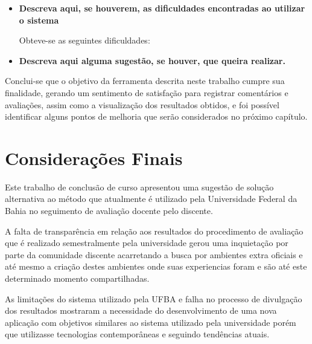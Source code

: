 \documentclass[12pt, a4paper]{report}
\begin{document}
\begin{itemize}
\item{\textbf{ Descreva aqui, se houverem, as dificuldades encontradas ao utilizar o sistema}}

Obteve-se as seguintes dificuldades:

\item{\textbf{ Descreva aqui alguma sugestão, se houver, que queira realizar.}}

\end{itemize}

Conclui-se que o objetivo da ferramenta descrita neste trabalho cumpre sua finalidade, gerando um sentimento de satisfação para registrar comentários e avaliações, assim como a visualização dos resultados obtidos, e foi possível identificar alguns pontos de melhoria que serão considerados no próximo capítulo.

\chapter{Considerações Finais}
\label{chap:consideracoes}

Este trabalho de conclusão de curso apresentou uma sugestão de solução alternativa ao método que atualmente é utilizado pela Universidade Federal da Bahia no seguimento de avaliação docente pelo discente.

A falta de transparência em relação aos resultados do procedimento de avaliação que é realizado semestralmente pela universidade gerou uma inquietação por parte da comunidade discente acarretando a busca por ambientes extra oficiais e até mesmo a criação destes ambientes onde suas experiencias foram e são até este determinado momento compartilhadas.

As limitações do sistema utilizado pela UFBA e falha no processo de divulgação dos resultados mostraram a necessidade do desenvolvimento de uma nova aplicação com objetivos similares ao sistema utilizado pela universidade porém que  utilizasse tecnologias contemporâneas e seguindo tendências atuais. 
\end{document}
